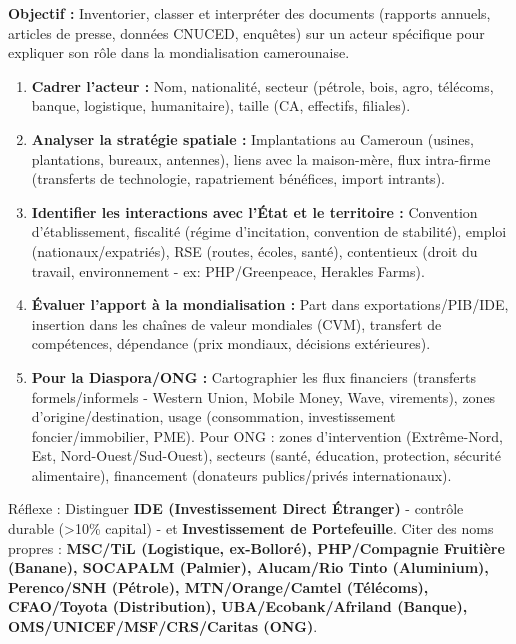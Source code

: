 \documentclass[11pt]{article}
\newcommand{\cle}[1]{{\popxbold\color{popdark}#1}}
\begin{document}
\begin{methode}
\textbf{Objectif :} Inventorier, classer et interpréter des documents (rapports annuels, articles de presse, données CNUCED, enquêtes) sur un acteur spécifique pour expliquer son rôle dans la mondialisation camerounaise.
\begin{enumerate}
    \item \textbf{Cadrer l'acteur :} Nom, nationalité, secteur (pétrole, bois, agro, télécoms, banque, logistique, humanitaire), taille (CA, effectifs, filiales).
    \item \textbf{Analyser la stratégie spatiale :} Implantations au Cameroun (usines, plantations, bureaux, antennes), liens avec la maison-mère, flux intra-firme (transferts de technologie, rapatriement bénéfices, import intrants).
    \item \textbf{Identifier les interactions avec l'État et le territoire :} Convention d'établissement, fiscalité (régime d'incitation, convention de stabilité), emploi (nationaux/expatriés), RSE (routes, écoles, santé), contentieux (droit du travail, environnement - ex: PHP/Greenpeace, Herakles Farms).
    \item \textbf{Évaluer l'apport à la mondialisation :} Part dans exportations/PIB/IDE, insertion dans les chaînes de valeur mondiales (CVM), transfert de compétences, dépendance (prix mondiaux, décisions extérieures).
    \item \textbf{Pour la Diaspora/ONG :} Cartographier les flux financiers (transferts formels/informels - Western Union, Mobile Money, Wave, virements), zones d'origine/destination, usage (consommation, investissement foncier/immobilier, PME). Pour ONG : zones d'intervention (Extrême-Nord, Est, Nord-Ouest/Sud-Ouest), secteurs (santé, éducation, protection, sécurité alimentaire), financement (donateurs publics/privés internationaux).
\end{enumerate}
\cle{Réflexe} : Distinguer \textbf{IDE (Investissement Direct Étranger)} - contrôle durable (>10\% capital) - et \textbf{Investissement de Portefeuille}. Citer des noms propres : \textbf{MSC/TiL (Logistique, ex-Bolloré), PHP/Compagnie Fruitière (Banane), SOCAPALM (Palmier), Alucam/Rio Tinto (Aluminium), Perenco/SNH (Pétrole), MTN/Orange/Camtel (Télécoms), CFAO/Toyota (Distribution), UBA/Ecobank/Afriland (Banque), OMS/UNICEF/MSF/CRS/Caritas (ONG)}.
\end{methode}
\end{document}
